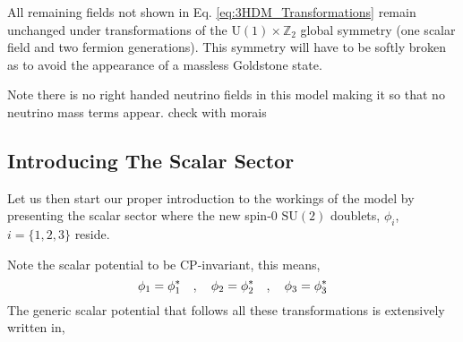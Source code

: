 %
All remaining fields not shown in Eq. \ref{eq:3HDM_Transformations} remain unchanged under transformations of the $\mathrm{U(1)}\times\mathbb{Z}_2$ global symmetry (one scalar field and two fermion generations).  
%
This symmetry will have to be softly broken as to avoid the appearance of a massless Goldstone state.

Note there is no right handed neutrino fields in this model making it so that no neutrino mass terms appear. { \color{blue} check with morais } 

\subsection{Introducing The Scalar Sector}

Let us then start our proper introduction to the workings of the model by presenting the scalar sector where the new spin-0 $\mathrm{SU(2)}$ doublets, $\phi_i$, $i=\{1,2,3\}$ reside. 
\begin{comment}
The scalar doublets are made to transform under the imposed $\mathrm{U(1)}\times \mathbb{Z}_2$ symmetries as, 
%
\begin{equation}
\begin{split}
\mathrm{U(1)} & : \phi_1 \rightarrow \phi_1 e^{i \alpha} \quad ,
            \quad \phi_3 \rightarrow \phi_3 e^{i \alpha}  \\
\mathbb{Z}_2  & : \phi_1 \rightarrow -\phi_1 \ \ \quad , 
            \quad \phi_2 \rightarrow \phi_2  \quad , 
            \quad \phi_3 \rightarrow \phi_3 \quad .
\end{split}
\end{equation}
\end{comment}
Note the scalar potential to be CP-invariant, this means,
\begin{equation}
\phi_1 = \phi_1^{\**} \quad , \quad \phi_2 = \phi_2^{\**} \quad , \quad 
\phi_3 = \phi_3^{\**} 
\end{equation}
The generic scalar potential that follows all these transformations is extensively written in, 
